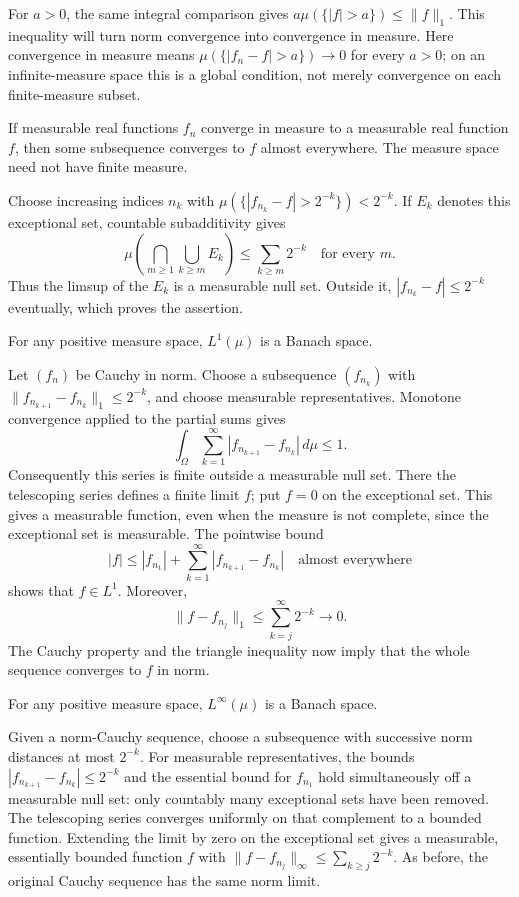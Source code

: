 For $a>0$, the same integral comparison gives
$a\mu(\{|f|>a\})\leqslant\|f\|_1$. This inequality will turn
norm convergence into convergence in measure. Here convergence in
measure means $\mu(\{|f_n-f|>a\})\to0$ for every $a>0$; on an
infinite-measure space this is a global condition, not merely convergence
on each finite-measure subset.

\begin{lemma}
\label{lem:measure_subsequence}
If measurable real functions $f_n$ converge in measure to a measurable
real function $f$, then some subsequence converges to $f$ almost everywhere.
The measure space need not have finite measure.
\end{lemma}
\Proof
Choose increasing indices $n_k$ with
$\mu(\{|f_{n_k}-f|>2^{-k}\})<2^{-k}$. If $E_k$ denotes this
exceptional set, countable subadditivity gives
\[
\mu\left(\bigcap_{m\geqslant1}\bigcup_{k\geqslant m}E_k\right)
\leqslant\sum_{k\geqslant m}2^{-k}
\quad\text{for every }m.
\]
Thus the limsup of the $E_k$ is a measurable null set. Outside it,
$|f_{n_k}-f|\leqslant2^{-k}$ eventually, which proves the assertion.
\Done

\begin{theorem}[Completeness of $L^1$]
For any positive measure space, $L^1(\mu)$ is a Banach space.
\end{theorem}
\Proof
Let $(f_n)$ be Cauchy in norm. Choose a subsequence $(f_{n_k})$ with
$\|f_{n_{k+1}}-f_{n_k}\|_1\leqslant2^{-k}$, and choose measurable
representatives. Monotone convergence applied to the partial sums gives
\[
\int_\Omega\sum_{k=1}^\infty
 |f_{n_{k+1}}-f_{n_k}|\,d\mu\leqslant1.
\]
Consequently this series is finite outside a measurable null set.
There the telescoping series defines a finite limit $f$; put $f=0$
on the exceptional set. This gives a measurable function, even when
the measure is not complete, since the exceptional set is measurable.
The pointwise bound
\[
|f|\leqslant |f_{n_1}|+
\sum_{k=1}^\infty|f_{n_{k+1}}-f_{n_k}|
\quad\text{almost everywhere}
\]
shows that $f\in L^1$. Moreover,
\[
\|f-f_{n_j}\|_1\leqslant\sum_{k=j}^\infty2^{-k}\longrightarrow0.
\]
The Cauchy property and the triangle inequality now imply that the
whole sequence converges to $f$ in norm.
\Done

\begin{theorem}
For any positive measure space, $L^\infty(\mu)$ is a Banach space.
\end{theorem}
\Proof
Given a norm-Cauchy sequence, choose a subsequence with successive
norm distances at most $2^{-k}$. For measurable representatives,
the bounds $|f_{n_{k+1}}-f_{n_k}|\leqslant2^{-k}$ and the essential
bound for $f_{n_1}$ hold simultaneously off a measurable null set:
only countably many exceptional sets have been removed. The telescoping
series converges uniformly on that complement to a bounded function.
Extending the limit by zero on the exceptional set gives a measurable,
essentially bounded function $f$ with
$\|f-f_{n_j}\|_\infty\leqslant\sum_{k\geqslant j}2^{-k}$.
As before, the original Cauchy sequence has the same norm limit.
\Done

